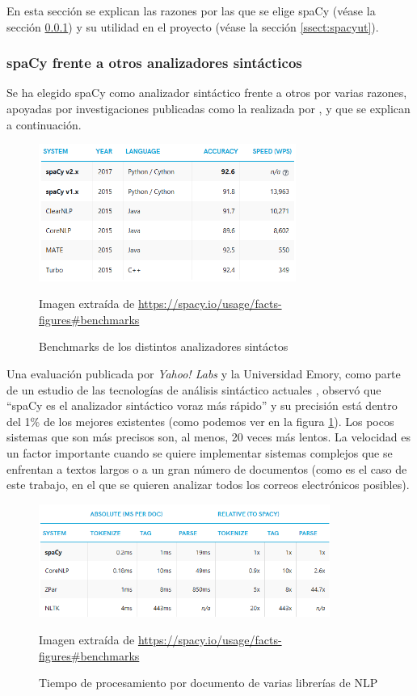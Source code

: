 En esta sección se explican las razones por las que se elige spaCy (véase la sección \ref{ssect:spacywhy}) y su utilidad en el proyecto (véase la sección \ref{ssect:spacyut}).

\subsubsection{spaCy frente a otros analizadores sintácticos}\label{ssect:spacywhy}

Se ha elegido spaCy como analizador sintáctico frente a otros por varias razones, apoyadas por investigaciones publicadas como la realizada por \cite{choi2015depends}, y que se explican a continuación.

\begin{figure}[h]
	\centering%
	\includegraphics[width = 0.75\textwidth]{Imagenes/Bitmap/spacyeval.png}%
	\caption{Benchmarks de los distintos analizadores sintáctos}%
	Imagen extraída de \url{https://spacy.io/usage/facts-figures#benchmarks}
	\label{fig:spacyeval}
\end{figure}

Una evaluación publicada por \textit{Yahoo! Labs} y la Universidad Emory, como parte de un estudio de las tecnologías de análisis sintáctico actuales \citep{choi2015depends}, observó que ``spaCy es el analizador sintáctico voraz más rápido'' y su precisión está dentro del 1\% de los mejores existentes (como podemos ver en la figura \ref{fig:spacyeval}). Los pocos sistemas que son más precisos son, al menos, 20 veces más lentos. La velocidad es un factor importante cuando se quiere implementar sistemas complejos que se enfrentan a textos largos o a un gran número de documentos (como es el caso de este trabajo, en el que se quieren analizar todos los correos electrónicos posibles).

\begin{figure}[h]
	\centering%
	\includegraphics[width = 0.85\textwidth]{Imagenes/Bitmap/spacyspeed.png}%
	\caption{Tiempo de procesamiento por documento de varias librerías de NLP}%
	Imagen extraída de \url{https://spacy.io/usage/facts-figures#benchmarks}
	\label{fig:spacyspeed}
\end{figure}

